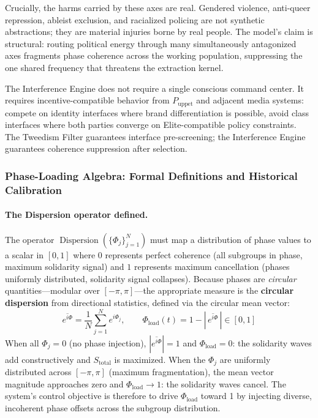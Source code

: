 \documentclass[12pt,openany]{book}
\begin{document}
Crucially, the harms carried by these axes are real. Gendered violence, anti-queer repression, ableist exclusion, and racialized policing are not synthetic abstractions; they are material injuries borne by real people. The model's claim is structural: routing political energy through many simultaneously antagonized axes fragments phase coherence across the working population, suppressing the one shared frequency that threatens the extraction kernel.

The Interference Engine does not require a single conscious command center. It requires incentive-compatible behavior from $P_{\text{uppet}}$ and adjacent media systems: compete on identity interfaces where brand differentiation is possible, avoid class interfaces where both parties converge on Elite-compatible policy constraints. The Tweedism Filter guarantees interface pre-screening; the Interference Engine guarantees coherence suppression after selection.

\subsubsection{Phase-Loading Algebra: Formal Definitions and Historical Calibration}
\label{sec:phase_loading_algebra}

\paragraph{The Dispersion operator defined.}
The operator $\operatorname{Dispersion}(\{\Phi_j\}_{j=1}^N)$ must map a distribution of phase values to a scalar in $[0,1]$ where $0$ represents perfect coherence (all subgroups in phase, maximum solidarity signal) and $1$ represents maximum cancellation (phases uniformly distributed, solidarity signal collapses). Because phases are \textit{circular} quantities---modular over $[-\pi, \pi]$---the appropriate measure is the \textbf{circular dispersion} from directional statistics, defined via the circular mean vector:
\[
\overline{e^{i\Phi}} = \frac{1}{N}\sum_{j=1}^{N} e^{i\Phi_j}, \qquad
\Phi_{\text{load}}(t) = 1 - \left|\,\overline{e^{i\Phi}}\,\right| \in [0,1]
\]
When all $\Phi_j = 0$ (no phase injection), $|\overline{e^{i\Phi}}| = 1$ and $\Phi_{\text{load}} = 0$: the solidarity waves add constructively and $S_{\text{total}}$ is maximized. When the $\Phi_j$ are uniformly distributed across $[-\pi,\pi]$ (maximum fragmentation), the mean vector magnitude approaches zero and $\Phi_{\text{load}} \to 1$: the solidarity waves cancel. The system's control objective is therefore to drive $\Phi_{\text{load}}$ toward 1 by injecting diverse, incoherent phase offsets across the subgroup distribution.
\end{document}
